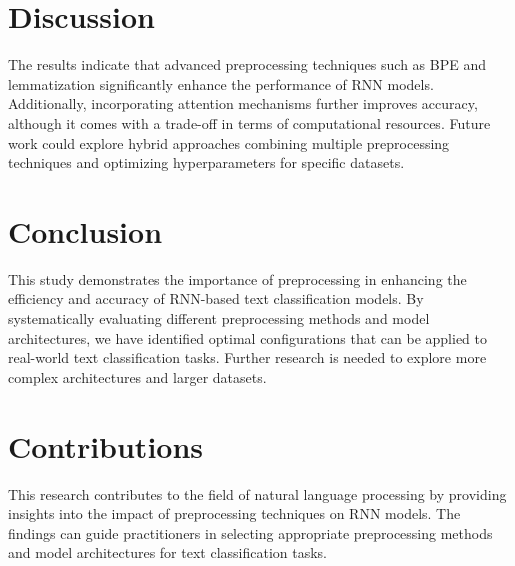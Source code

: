\documentclass{article}
\begin{document}
\section{Discussion}
The results indicate that advanced preprocessing techniques such as BPE and lemmatization significantly enhance the performance of RNN models. Additionally, incorporating attention mechanisms further improves accuracy, although it comes with a trade-off in terms of computational resources. Future work could explore hybrid approaches combining multiple preprocessing techniques and optimizing hyperparameters for specific datasets.

\section{Conclusion}
This study demonstrates the importance of preprocessing in enhancing the efficiency and accuracy of RNN-based text classification models. By systematically evaluating different preprocessing methods and model architectures, we have identified optimal configurations that can be applied to real-world text classification tasks. Further research is needed to explore more complex architectures and larger datasets.

\section{Contributions}
This research contributes to the field of natural language processing by providing insights into the impact of preprocessing techniques on RNN models. The findings can guide practitioners in selecting appropriate preprocessing methods and model architectures for text classification tasks.



\end{document}
